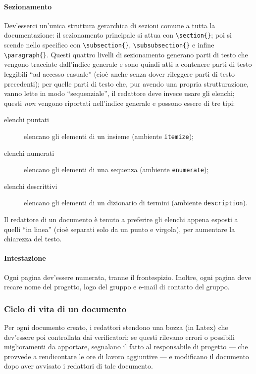 \paragraph{Sezionamento} Dev'esserci un'unica struttura gerarchica di sezioni comune a tutta la documentazione: il sezionamento principale si attua con \texttt{\textbackslash section\{\}}; poi si scende nello specifico con \texttt{\textbackslash subsection\{\}}, \texttt{\textbackslash subsubsection\{\}} e infine \texttt{\textbackslash paragraph\{\}}. Questi quattro livelli di sezionamento generano parti di testo che vengono tracciate dall'indice generale e sono quindi atti a contenere parti di testo leggibili “ad accesso casuale” (cioè anche senza dover rileggere parti di testo precedenti); per quelle parti di testo che, pur avendo una propria strutturazione, vanno lette in modo “sequenziale”, il redattore deve invece usare gli elenchi; questi \emph{non} vengono riportati nell'indice generale e possono essere di tre tipi:
\begin{description}
	\item[elenchi puntati] elencano gli elementi di un insieme (ambiente \texttt{itemize});
	\item[elenchi numerati] elencano gli elementi di una sequenza (ambiente \texttt{enumerate});
	\item[elenchi descrittivi] elencano gli elementi di un dizionario di termini (ambiente \texttt{description}).
\end{description}
Il redattore di un documento è tenuto a preferire gli elenchi appena esposti a quelli “in linea” (cioè separati solo da un punto e virgola), per aumentare la chiarezza del testo.
\paragraph{Intestazione} Ogni pagina dev'essere numerata, tranne il frontespizio. Inoltre, ogni pagina deve recare nome del progetto, logo del gruppo e e-mail di contatto del gruppo.

\subsubsection{Ciclo di vita di un documento} Per ogni documento creato, i redattori stendono una bozza (in Latex) che dev'essere poi controllata dai verificatori; se questi rilevano errori o possibili miglioramenti da apportare, segnalano il fatto al responsabile di progetto --- che provvede a rendicontare le ore di lavoro aggiuntive --- e modificano il documento dopo aver avvisato i redattori di tale documento.

